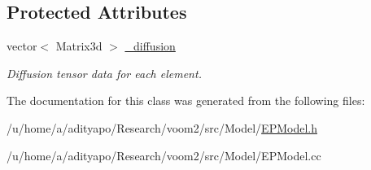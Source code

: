 \subsection*{Protected Attributes}
\begin{DoxyCompactItemize}
\item 
\hypertarget{classvoom_1_1_e_p_model_a594a746e2b5811d827fa48803c9da534}{
vector$<$ Matrix3d $>$ \hyperlink{classvoom_1_1_e_p_model_a594a746e2b5811d827fa48803c9da534}{\_\-diffusion}}
\label{classvoom_1_1_e_p_model_a594a746e2b5811d827fa48803c9da534}

\begin{DoxyCompactList}\small\item\em Diffusion tensor data for each element. \item\end{DoxyCompactList}\end{DoxyCompactItemize}


The documentation for this class was generated from the following files:\begin{DoxyCompactItemize}
\item 
/u/home/a/adityapo/Research/voom2/src/Model/\hyperlink{_e_p_model_8h}{EPModel.h}\item 
/u/home/a/adityapo/Research/voom2/src/Model/EPModel.cc\end{DoxyCompactItemize}
